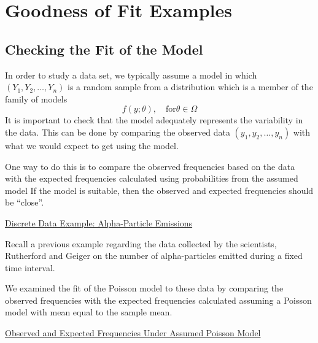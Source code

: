\section{Goodness of Fit Examples}
\subsection{Checking the Fit of the Model}
In order to study a data set, we typically assume a model in which $\left(Y_{1}, Y_{2}, \ldots, Y_{n}\right)$ is a random sample from a distribution which is a member of the family of models
\[
    f(y ; \theta), \quad \text{for} \theta \in \Omega
\]
It is important to check that the model adequately represents the variability in the data.
This can be done by comparing the observed data $\left(y_{1}, y_{2}, \ldots, y_{n}\right)$ with what we would expect to get using the model.

One way to do this is to compare the observed frequencies based on the data with the expected frequencies calculated using probabilities from the assumed model
If the model is suitable, then the observed and expected frequencies should be ``close''.

\underline{Discrete Data Example: Alpha-Particle Emissions}

Recall a previous example regarding the data collected by the scientists, Rutherford and Geiger on the number of alpha-particles emitted during a fixed time interval.

We examined the fit of the Poisson model to these data by comparing the observed frequencies with the expected frequencies calculated assuming a Poisson model with mean equal to the sample mean.

\underline{Observed and Expected Frequencies Under Assumed Poisson Model}

